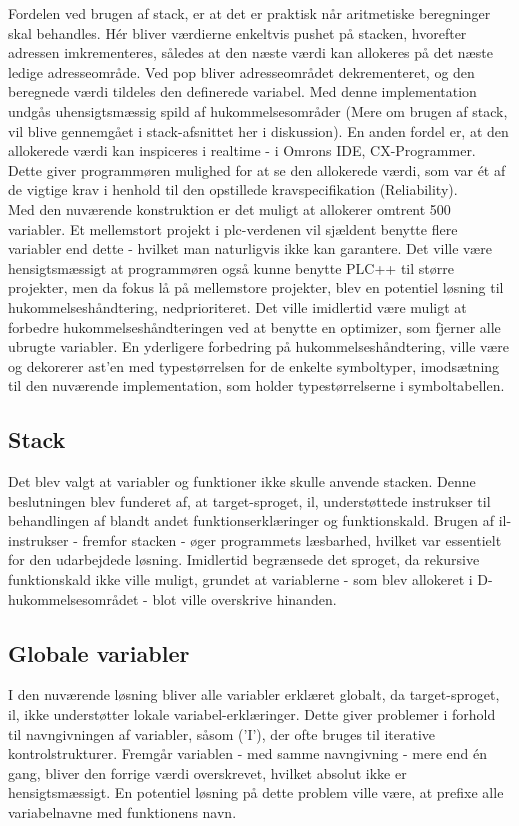 \noindent Fordelen ved brugen af stack, er at det er praktisk når aritmetiske beregninger skal behandles. Hér bliver værdierne enkeltvis pushet på stacken, hvorefter adressen imkrementeres, således at den næste værdi kan allokeres på det næste ledige adresseområde. Ved pop bliver adresseområdet dekrementeret, og den beregnede værdi tildeles den definerede variabel. Med denne implementation undgås uhensigtsmæssig spild af hukommelsesområder (Mere om brugen af stack, vil blive gennemgået i stack-afsnittet her i diskussion).
En anden fordel er, at den allokerede værdi kan inspiceres i realtime - i Omrons IDE, CX-Programmer. Dette giver programmøren mulighed for at se den allokerede værdi, som var ét af de vigtige krav i henhold til den opstillede kravspecifikation (Reliability). \\

\noindent Med den nuværende konstruktion er det muligt at allokerer omtrent 500 variabler. Et mellemstort projekt i \gls{plc}-verdenen vil sjældent benytte flere variabler end dette - hvilket man naturligvis ikke kan garantere. Det ville være hensigtsmæssigt at programmøren også kunne benytte PLC++ til større projekter, men da fokus lå på mellemstore projekter, blev en potentiel løsning til hukommelseshåndtering, nedprioriteret.  
Det ville imidlertid være muligt at forbedre hukommelseshåndteringen ved at benytte en optimizer, som fjerner alle ubrugte variabler.   
En yderligere forbedring på hukommelseshåndtering, ville være og dekorerer \gls{ast}'en med typestørrelsen for de enkelte symboltyper, imodsætning til den nuværende implementation, som holder typestørrelserne i symboltabellen.

\subsection*{Stack}
\noindent Det blev valgt at variabler og funktioner ikke skulle anvende stacken. Denne beslutningen blev funderet af, at target-sproget, \gls{il}, understøttede instrukser til behandlingen af blandt andet funktionserklæringer og funktionskald. Brugen af \gls{il}-instrukser - fremfor stacken - øger programmets læsbarhed, hvilket var essentielt for den udarbejdede løsning. Imidlertid begrænsede det sproget, da rekursive funktionskald ikke ville muligt, grundet at variablerne - som blev allokeret i D-hukommelsesområdet - blot ville overskrive hinanden.
\subsection*{Globale variabler}
I den nuværende løsning bliver alle variabler erklæret globalt, da target-sproget, \gls{il}, ikke understøtter lokale variabel-erklæringer. Dette giver problemer i forhold til navngivningen af variabler, såsom ('I'), der ofte bruges til iterative kontrolstrukturer. Fremgår variablen - med samme navngivning - mere end én gang, bliver den forrige værdi overskrevet, hvilket absolut ikke er hensigtsmæssigt. 
En potentiel løsning på dette problem ville være, at prefixe alle variabelnavne med funktionens navn.









